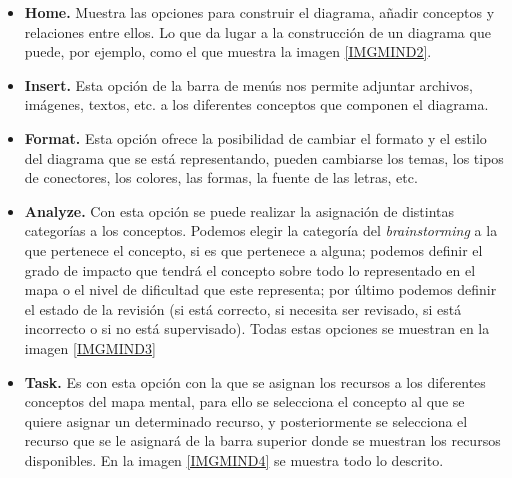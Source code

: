 \documentclass[11pt,a4paper,spanish,twoside]{report}
\begin{document}
        \begin{itemize}
          \item \textbf{Home.} Muestra las opciones para construir el
            diagrama, añadir conceptos y relaciones entre ellos. Lo que da
            lugar a la construcción de un diagrama que puede, por ejemplo,
            como el que muestra la imagen \ref{IMGMIND2}.


          \item \textbf{Insert.} Esta opción de la barra de menús nos permite
            adjuntar archivos, imágenes, textos, etc. a los diferentes
            conceptos que componen el diagrama. 

          \item \textbf{Format.} Esta opción ofrece la posibilidad de cambiar
            el formato y el estilo del diagrama que se está representando,
            pueden cambiarse los temas, los tipos de conectores, los colores,
            las formas, la fuente de las letras, etc.

          \item \textbf{Analyze.} Con esta opción se puede realizar la
            asignación de distintas categorías a los conceptos. Podemos
            elegir la categoría del \emph{brainstorming} a la que pertenece
            el concepto, si es que pertenece a alguna; podemos definir el
            grado de impacto que tendrá el concepto sobre todo lo
            representado en el mapa o el nivel de dificultad que este
            representa; por último podemos definir el estado de la revisión
            (si está correcto, si necesita ser revisado, si está incorrecto o
            si no está supervisado). Todas estas opciones se muestran en la
            imagen \ref{IMGMIND3}


          \item \textbf{Task.} Es con esta opción con la que se asignan los
            recursos a los diferentes conceptos del mapa mental, para ello se
            selecciona el concepto al que se quiere asignar un determinado
            recurso, y posteriormente se selecciona el recurso que se le
            asignará de la barra superior donde se muestran los recursos
            disponibles. En la imagen \ref{IMGMIND4} se muestra todo lo
            descrito.


\end{itemize}
\end{document}
